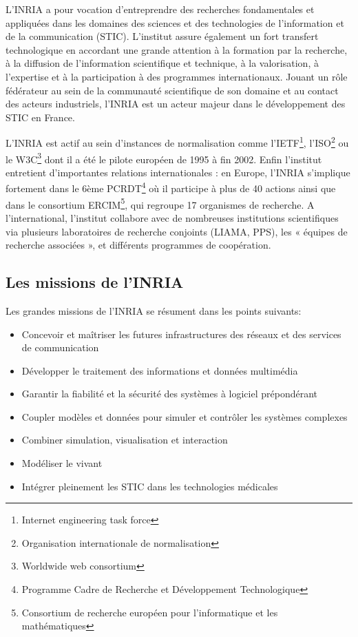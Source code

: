 \documentclass[a4paper, 11pt]{report}
\begin{document}
    L’INRIA a pour vocation d’entreprendre des recherches fondamentales et
    appliquées dans les domaines des sciences et des technologies de l’information
    et de la communication (STIC). L’institut assure également un fort
    transfert technologique en accordant une grande attention à la formation
    par la recherche, à la diffusion de l’information scientifique et
    technique, à la valorisation, à l’expertise et à la participation à des
    programmes internationaux. Jouant un rôle fédérateur au sein de la
    communauté scientifique de son domaine et au contact des acteurs
    industriels, l’INRIA est un acteur majeur dans le développement des STIC en
    France.

    L’INRIA est actif au sein d’instances de normalisation comme l’IETF\footnote{Internet engineering task force},
    l’ISO\footnote{Organisation internationale de normalisation} ou le W3C\footnote{Worldwide web consortium} dont il a été le pilote européen de 1995 à fin 2002.
    Enfin l’institut entretient d’importantes relations internationales : en
    Europe, l’INRIA s’implique fortement dans le 6ème PCRDT\footnote{Programme Cadre de Recherche et Développement Technologique} où il participe
    à plus de 40 actions ainsi que dans le consortium ERCIM\footnote{Consortium de recherche européen pour l'informatique et les mathématiques}, qui regroupe 17
    organismes de recherche. A l’international, l’institut collabore avec de
    nombreuses institutions scientifiques via plusieurs laboratoires de
    recherche conjoints (LIAMA, PPS), les « équipes de recherche associées »,
    et différents programmes de coopération.

    \subsection{Les missions de l'INRIA}
    Les grandes missions de l'INRIA se résument dans les points suivants:
    \begin{itemize}
     \item Concevoir et maîtriser les futures infrastructures des réseaux et
     des services de communication
     \item Développer le traitement des informations et données multimédia
     \item Garantir la fiabilité et la sécurité des systèmes à logiciel
     prépondérant
     \item Coupler modèles et données pour simuler et contrôler les systèmes
     complexes
     \item Combiner simulation, visualisation et interaction
     \item Modéliser le vivant
     \item Intégrer pleinement les STIC dans les technologies médicales
    \end{itemize}
\end{document}
